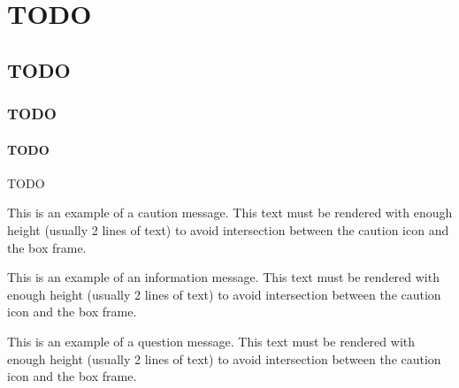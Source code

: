 \documentclass[book, english, french]{upmethodology-document}
\begin{document}
	\tableofcontents{}
	\listoffigures{}
	\newpage{}

	\chapter{TODO}
		\section{TODO}
			\subsection{TODO}
				\subsubsection{TODO}
						TODO
						\begin{upmcaution}
							This is an example of a caution message. This text must be rendered with enough height (usually 2 lines of text) to avoid intersection between the caution icon and the box frame.
						\end{upmcaution}
						\begin{upminfo}
							This is an example of an information message. This text must be rendered with enough height (usually 2 lines of text) to avoid intersection between the caution icon and the box frame.
						\end{upminfo}
						\begin{upmquestion}
							This is an example of a question message. This text must be rendered with enough height (usually 2 lines of text) to avoid intersection between the caution icon and the box frame.
						\end{upmquestion}
	\nocite{*}
	
	
\end{document}
